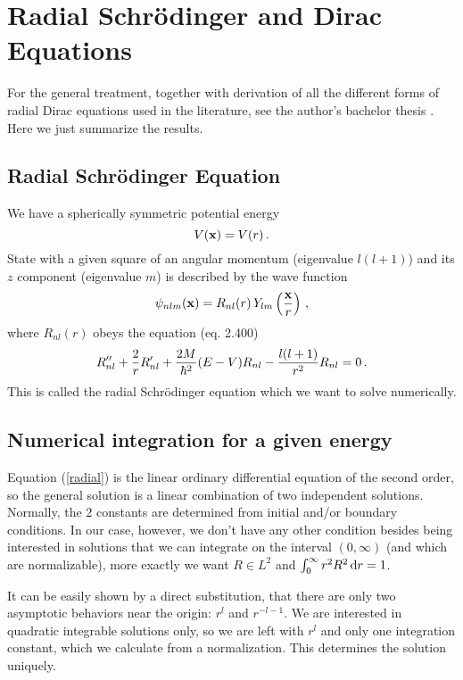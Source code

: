 \section{Radial Schrödinger and Dirac Equations}

For the general treatment, together with derivation of all the different forms
of
radial Dirac equations used in the literature, see the author's bachelor thesis
\cite{bachelor-thesis}. Here we just summarize the results.

\subsection{Radial Schrödinger Equation}

We have a spherically symmetric potential energy 
\begin{equation*}
  V({\bf x})=V(r)\,.
\end{equation*}
State with a given square of an angular momentum (eigenvalue $l(l+1)$) and its $z$ component (eigenvalue $m$) is described by the wave function 
\begin{equation}
  \psi_{nlm}({\bf x})=R_{nl}(r)\,Y_{lm}\left({\bf x}\over r\right)\,,  \label{psi}
\end{equation}
where $R_{nl}(r)$ obeys the equation \cite{formanek} (eq. 2.400) 
\begin{equation}
  R_{nl}''+{2\over r}R_{nl}'+{2M\over\hbar^2}(E-V)R_{nl}- {l(l+1)\over r^2}R_{nl}=0\,.  \label{radial}
\end{equation}
This is called the radial Schrödinger equation which we want to solve numerically.

\subsection{Numerical integration for a given energy}

Equation (\ref{radial}) is the linear ordinary differential equation of the second order, so the general solution is a linear combination of two independent solutions. Normally, the $2$ constants are determined from initial and/or boundary conditions. In our case, however, we don't have any other condition besides being interested in solutions that we can integrate on the interval $(0,\infty)$ (and which are normalizable), more exactly we want $R\in L^2$ and $\int_0^\infty r^2R^2\,{\rm d} r=1$.

It can be easily shown by a direct substitution, that there are only two asymptotic behaviors near the origin: $r^l$ and $r^{-l-1}$. We are interested in quadratic integrable solutions only, so we are left with $r^l$ and only one integration constant, which we calculate from a normalization. This determines the solution uniquely.

